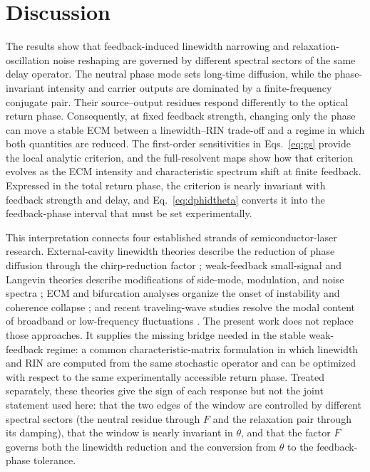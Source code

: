 \documentclass{optica-article}
\newif\ifmarked
\newcommand{\rev}[1]{\ifmarked{\color{blue}#1}\else#1\fi}
\begin{document}
\section{Discussion}

The results show that feedback-induced linewidth narrowing and relaxation-oscillation noise reshaping are governed by different spectral sectors of the same delay operator. The neutral phase mode sets long-time diffusion, while the phase-invariant intensity and carrier outputs are dominated by a finite-frequency conjugate pair. Their source--output residues respond differently to the optical return phase. Consequently, at fixed feedback strength, changing only the phase can move a stable ECM between a linewidth--RIN trade-off and a regime in which both quantities are reduced. The first-order sensitivities in Eqs.~\eqref{eq:gs} provide the local analytic criterion, and the full-resolvent maps show how that criterion evolves as the ECM intensity and characteristic spectrum shift at finite feedback. \rev{Expressed in the total return phase, the criterion is nearly invariant with feedback strength and delay, and Eq.~\eqref{eq:dphidtheta} converts it into the feedback-phase interval that must be set experimentally.}

This interpretation connects four established strands of semiconductor-laser research. External-cavity linewidth theories describe the reduction of phase diffusion through the chirp-reduction factor \cite{KazarinovHenry1987,Wenzel2021}; weak-feedback small-signal and Langevin theories describe modifications of side-mode, modulation, and noise spectra \cite{RitterHaug1993}; ECM and bifurcation analyses organize the onset of instability and coherence collapse \cite{SchunkPetermann1988,Rottschafer2007,Yanchuk2010,Soriano2013}; and recent traveling-wave studies resolve the modal content of broadband or low-frequency fluctuations \cite{RadziunasKane2024,RadziunasKane2026}. The present work does not replace those approaches. It supplies the missing bridge needed in the stable weak-feedback regime: a common characteristic-matrix formulation in which linewidth and RIN are computed from the same stochastic operator and can be optimized with respect to the same experimentally accessible return phase. \rev{Treated separately, these theories give the sign of each response but not the joint statement used here: that the two edges of the window are controlled by different spectral sectors (the neutral residue through $F$ and the relaxation pair through its damping), that the window is nearly invariant in $\theta$, and that the factor $F$ governs both the linewidth reduction and the conversion from $\theta$ to the feedback-phase tolerance.}
\end{document}
